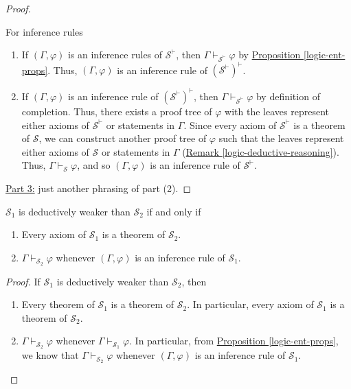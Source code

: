 \documentclass{treatise}
\begin{document}
\begin{shaded}
\begin{proof}
\begin{enumerate}
\end{enumerate}
For inference rules
\begin{enumerate}
    \item If $(\Gamma, \varphi)$ is an inference rules of $\mathcal{S}^{\vdash}$, then $\Gamma \vdash_{\mathcal{S}^{\vdash}} \varphi$ by \hyperref[logic-ent-props]{Proposition \ref*{logic-ent-props}}. Thus, $(\Gamma, \varphi)$ is an inference rule of $(\mathcal{S}^{\vdash})^{\vdash}$.
    \item If $(\Gamma, \varphi)$ is an inference rule of $(\mathcal{S}^{\vdash})^{\vdash}$, then $\Gamma \vdash_{\mathcal{S}^{\vdash}} \varphi$ by definition of completion. Thus, there exists a proof tree of $\varphi$ with the leaves represent either axioms of $\mathcal{S}^{\vdash}$ or statements in $\Gamma$. Since every axiom of $\mathcal{S}^{\vdash}$ is a theorem of $\mathcal{S}$, we can construct another proof tree of $\varphi$ such that the leaves represent either axioms of $\mathcal{S}$ or statements in $\Gamma$ (\hyperref[logic-deductive-reasoning]{Remark \ref*{logic-deductive-reasoning}}). Thus, $\Gamma \vdash_{\mathcal{S}} \varphi$, and so $(\Gamma, \varphi)$ is an inference rule of $\mathcal{S}^{\vdash}$.
\end{enumerate}
\underline{Part 3:} just another phrasing of part (2).
\end{proof}
\begin{proposition}
$\mathcal{S}_1$ is deductively weaker than $\mathcal{S}_2$ if and only if
\begin{enumerate}
    \item Every axiom of $\mathcal{S}_1$ is a theorem of $\mathcal{S}_2$.
    \item $\Gamma \vdash_{\mathcal{S}_2} \varphi$ whenever $(\Gamma, \varphi)$ is an inference rule of $\mathcal{S}_1$.
\end{enumerate}
\end{proposition}
\begin{proof}
If $\mathcal{S}_1$ is deductively weaker than $\mathcal{S}_2$, then
\begin{enumerate}
    \item Every theorem of $\mathcal{S}_1$ is a theorem of $\mathcal{S}_2$. In particular, every axiom of $\mathcal{S}_1$ is a theorem of $\mathcal{S}_2$.
    \item $\Gamma \vdash_{\mathcal{S}_2} \varphi$ whenever $\Gamma \vdash_{\mathcal{S}_1} \varphi$. In particular, from \hyperref[logic-ent-props]{Proposition \ref*{logic-ent-props}}, we know that $\Gamma \vdash_{\mathcal{S}_2} \varphi$ whenever $(\Gamma, \varphi)$ is an inference rule of $\mathcal{S}_1$.

\end{enumerate}
\end{proof}
\end{shaded}
\end{document}
